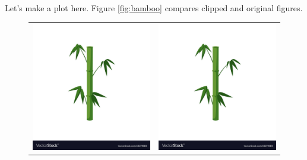 \documentclass[11pt]{article}
\theoremstyle{definition}
\theoremstyle{plain}
\begin{document}
Let's make a plot here. Figure \ref{fig:bamboo} compares clipped and original figures. 

\begin{figure}[H]
		\centering
		\begin{tabular}{cc}
		\includegraphics[clip, trim=0 3cm 0 0, scale=.15]{./figs/bamboo}	& \includegraphics[scale=.15]{./figs/bamboo} \\

\end{tabular}
\end{figure}
\end{document}
